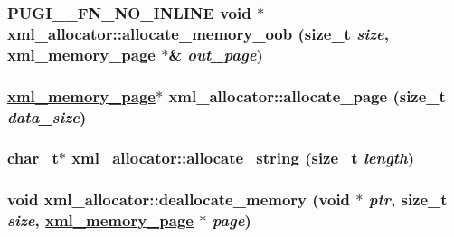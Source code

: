 \hypertarget{structxml__allocator_30bb557bc040de54c041c6d3dca6772e}{
\subsubsection[allocate\_\-memory\_\-oob]{\setlength{\rightskip}{0pt plus 5cm}PUGI\_\-\_\-FN\_\-NO\_\-INLINE void $\ast$ xml\_\-allocator::allocate\_\-memory\_\-oob (size\_\-t {\em size}, \hyperlink{structxml__memory__page}{xml\_\-memory\_\-page} $\ast$\& {\em out\_\-page})}}
\label{structxml__allocator_30bb557bc040de54c041c6d3dca6772e}


\hypertarget{structxml__allocator_4b399b01e530220ec5849b912b84063b}{
\subsubsection[allocate\_\-page]{\setlength{\rightskip}{0pt plus 5cm}\hyperlink{structxml__memory__page}{xml\_\-memory\_\-page}$\ast$ xml\_\-allocator::allocate\_\-page (size\_\-t {\em data\_\-size})}}
\label{structxml__allocator_4b399b01e530220ec5849b912b84063b}


\hypertarget{structxml__allocator_c5ec2b5d41672d6494a2742e95e525b3}{
\subsubsection[allocate\_\-string]{\setlength{\rightskip}{0pt plus 5cm}char\_\-t$\ast$ xml\_\-allocator::allocate\_\-string (size\_\-t {\em length})}}
\label{structxml__allocator_c5ec2b5d41672d6494a2742e95e525b3}


\hypertarget{structxml__allocator_5df417155487cce4e0460b123ac33dc6}{
\subsubsection[deallocate\_\-memory]{\setlength{\rightskip}{0pt plus 5cm}void xml\_\-allocator::deallocate\_\-memory (void $\ast$ {\em ptr}, size\_\-t {\em size}, \hyperlink{structxml__memory__page}{xml\_\-memory\_\-page} $\ast$ {\em page})}}
\label{structxml__allocator_5df417155487cce4e0460b123ac33dc6}


